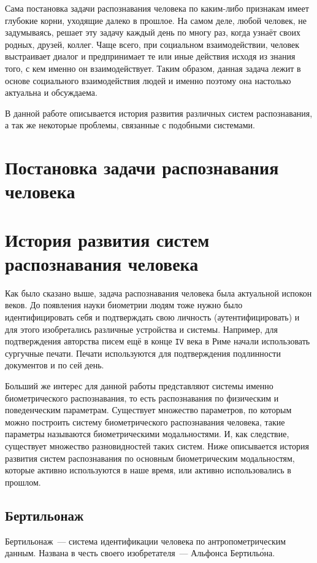 \documentclass[14pt, a4paper]{extarticle}
\begin{document}
Сама постановка задачи распознавания человека по каким-либо признакам имеет глубокие корни, уходящие далеко в прошлое. На самом деле, любой человек, не задумываясь, решает эту задачу каждый день по многу раз, когда узнаёт своих родных, друзей, коллег. Чаще всего, при социальном взаимодействии, человек выстраивает диалог и предпринимает те или иные действия исходя из знания того, с кем именно он взаимодействует. Таким образом, данная задача лежит в основе социального взаимодействия людей и именно поэтому она настолько актуальна и обсуждаема.

В данной работе описывается история развития различных систем распознавания, а так же некоторые проблемы, связанные с подобными системами.

\newpage
\section{Постановка задачи распознавания человека}

\newpage
\section{История развития систем распознавания человека}
Как было сказано выше, задача распознавания человека была актуальной испокон веков. До появления науки биометрии людям тоже нужно было идентифицировать себя и подтверждать свою личность (аутентифицировать) и для этого изобретались различные устройства и системы.
Например, для подтверждения авторства писем ещё в конце \texttt{IV} века в Риме начали использовать сургучные печати. Печати используются для подтверждения подлинности документов и по сей день.

Больший же интерес для данной работы представляют системы именно биометрического распознавания, то есть распознавания по физическим и поведенческим параметрам. Существует множество параметров, по которым можно построить систему биометрического распознавания человека, такие параметры называются биометрическими модальностями. И, как следствие, существует множество разновидностей таких систем. Ниже описывается история развития систем распознавания по основным биометрическим модальностям, которые активно используются в наше время, или активно использовались в прошлом.

\subsection{Бертильонаж}
Бертильонаж~--- система идентификации человека по антропометрическим данным. Названа в честь своего изобретателя~--- Альфонса Бертиль\'{о}на.
\end{document}

